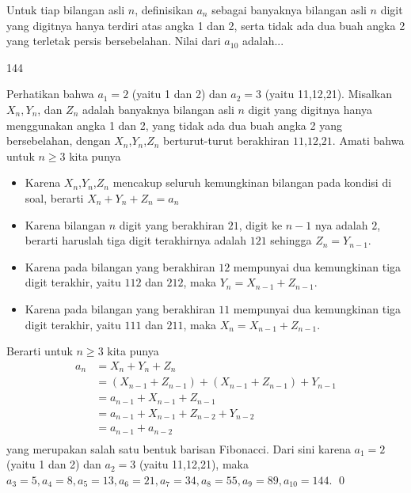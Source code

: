 \documentclass[12pt]{scrartcl}
\begin{document}
		\begin{soalbaru}
			Untuk tiap bilangan asli $n$, definisikan $a_n$ sebagai banyaknya bilangan asli $n$
				digit yang digitnya hanya terdiri atas angka 1 dan 2, serta tidak ada
				dua buah angka 2 yang terletak persis bersebelahan. Nilai dari $a_{10}$ adalah...
		
		\begin{jawaban}
		144
		\end{jawaban}
		\begin{solusi}
		Perhatikan bahwa $a_1=2$ (yaitu 1 dan 2) dan $a_2=3$ (yaitu 11,12,21).
		Misalkan $X_n,Y_n$, dan $Z_n$ adalah banyaknya bilangan asli $n$ digit yang digitnya hanya menggunakan angka 1 dan 2, yang tidak ada dua buah angka 2 yang bersebelahan, dengan $X_n$,$Y_n$,$Z_n$ berturut-turut berakhiran $11$,$12$,$21$. Amati bahwa untuk $n \ge 3$ kita punya \begin{itemize}
		\item Karena $X_n$,$Y_n$,$Z_n$ mencakup seluruh kemungkinan bilangan pada kondisi di soal, berarti $X_n+Y_n+Z_n=a_n$
		\item Karena bilangan $n$ digit yang berakhiran $21$, digit ke $n-1$ nya adalah $2$, berarti haruslah tiga digit terakhirnya adalah $121$ sehingga $Z_n = Y_{n-1}$.
		\item Karena pada bilangan yang berakhiran $12$ mempunyai dua kemungkinan tiga digit terakhir, yaitu $112$ dan $212$, maka $Y_n=X_{n-1}+Z_{n-1}$.
		\item Karena pada bilangan yang berakhiran $11$ mempunyai dua kemungkinan tiga digit terakhir, yaitu $111$ dan $211$, maka $X_n=X_{n-1}+Z_{n-1}$.
		\end{itemize}
		Berarti untuk $n \ge 3$ kita punya\\[-30pt]
		 \begin{align*}
				a_n &= X_n+Y_n+Z_n\\
					&= (X_{n-1}+Z_{n-1})+(X_{n-1}+Z_{n-1})+Y_{n-1}\\
					&= a_{n-1}+X_{n-1}+Z_{n-1}\\
					&= a_{n-1}+X_{n-1}+Z_{n-2}+Y_{n-2}\\
					&= a_{n-1}+a_{n-2}\\[-30pt]
				\end{align*}
		yang merupakan salah satu bentuk barisan Fibonacci. Dari sini karena $a_1=2$ (yaitu 1 dan 2) dan $a_2=3$ (yaitu 11,12,21), maka $a_3=5, a_4=8, a_5=13, a_6=21, a_7=34, a_8=55, a_9=89, a_{10}=144$. \qed
		\end{solusi}
			\end{soalbaru}
\end{document}
